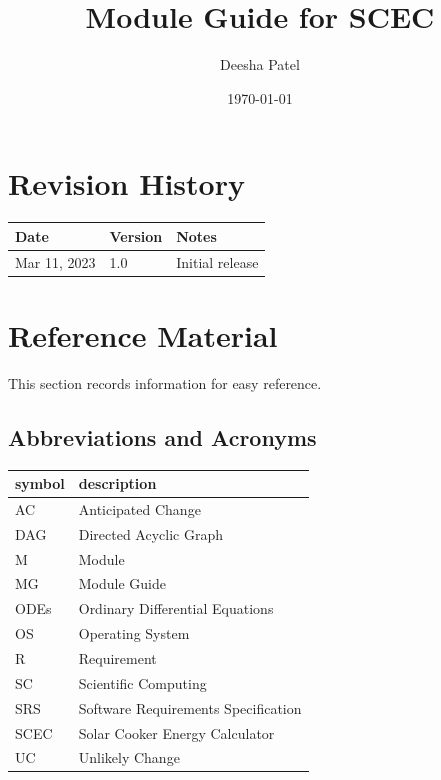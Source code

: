 \documentclass[12pt, titlepage]{article}
\begin{document}
\title{Module Guide for SCEC } 
\author{Deesha Patel}
\date{\today}

\maketitle


\section{Revision History}

\begin{tabularx}{\textwidth}{p{3cm}p{2cm}X}
\toprule {\bf Date} & {\bf Version} & {\bf Notes}\\
\midrule
Mar 11, 2023 & 1.0 & Initial release\\
\bottomrule
\end{tabularx}

\newpage

\section{Reference Material}

This section records information for easy reference.

\subsection{Abbreviations and Acronyms}

\renewcommand{\arraystretch}{1.2}
\begin{tabular}{l l} 
  \toprule		
  \textbf{symbol} & \textbf{description}\\
  \midrule 
  AC & Anticipated Change\\
  DAG & Directed Acyclic Graph \\
  M & Module \\
  MG & Module Guide \\
  ODEs & Ordinary Differential Equations \\ 
  OS & Operating System \\
  R & Requirement\\
  SC & Scientific Computing \\
  SRS & Software Requirements Specification\\
  SCEC & Solar Cooker Energy Calculator\\
  UC & Unlikely Change \\
  \bottomrule
\end{tabular}\\
\end{document}

